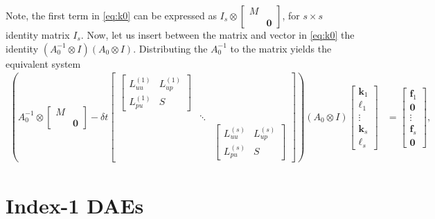 \documentclass[a4paper,10pt]{article}
\begin{document}
Note, the first term in \eqref{eq:k0} can be expressed as
$I_s \otimes \begin{bmatrix} M \\ & \mathbf{0}\end{bmatrix}$, for $s\times s$
identity matrix $I_s$. Now, let us insert between the matrix and vector in
\eqref{eq:k0} the identity $(A_0^{-1}\otimes I)(A_0\otimes I)$. Distributing the
$A_0^{-1}$ to the matrix yields the equivalent system
%
\begin{align}\label{eq:k1}
\left(A_0^{-1} \otimes \begin{bmatrix} M \\ & \mathbf{0}\end{bmatrix}
	- \delta t \begin{bmatrix} \begin{bmatrix} L^{(1)}_{uu} & L^{(1)}_{up} \\ L^{(1)}_{pu} & S \end{bmatrix} & \\
	\ & \ddots & \ \\ & & \begin{bmatrix} L^{(s)}_{uu} & L^{(s)}_{up} \\ L^{(s)}_{pu} & S \end{bmatrix} \end{bmatrix} \right)
	(A_0\otimes I)\begin{bmatrix} \mathbf{k}_1 \\ \ell_1 \\ \vdots \\ \mathbf{k}_s \\ \ell_s\end{bmatrix} 
& = \begin{bmatrix} \mathbf{f}_1 \\ \mathbf{0} \\ \vdots \\ \mathbf{f}_s \\ \mathbf{0} \end{bmatrix},
\end{align}
%

\section{Index-1 DAEs}
\end{document}
